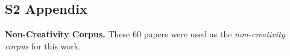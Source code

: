 \documentclass[10pt,letterpaper]{article}
\begin{document}
\subsection*{S2 Appendix}\label{S2_Appendix}
{\bf Non-Creativity Corpus.} These 60 papers were used as the {\em non-creativity corpus} for this work.

\end{document}
